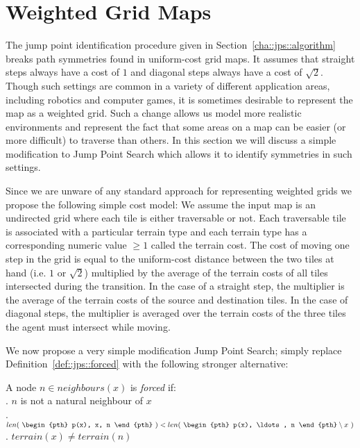 \section{Weighted Grid Maps}
The jump point identification procedure given in
Section~\ref{cha::jps::algorithm} breaks path symmetries found in uniform-cost
grid maps. It assumes that straight steps always have a cost of $1$ and
diagonal steps always have a cost of $\sqrt{2}$.  Though such settings are
common in a variety of different application areas, including robotics and
computer games, it is sometimes desirable to represent the map as a weighted
grid. Such a change allows us model more realistic environments and represent
the fact that some areas on a map can be easier (or more difficult) to
traverse than others.  In this section we will discuss a simple modification
to  Jump Point Search which allows it to identify symmetries in such settings.

Since we are unware of any standard approach for representing weighted grids
we propose the following simple cost model:
We assume the input map is an undirected grid where each tile is either
traversable or not.  Each traversable tile is associated with a particular
terrain type and each terrain type has a corresponding numeric value 
$\ge 1$ called the terrain cost.
The cost of moving one step in the grid is equal to the uniform-cost
distance between the two tiles at hand (i.e. $1$ or $\sqrt{2}$) multiplied by
the average of the terrain costs of all tiles intersected during the
transition.  In the case of a straight step, the multiplier is the average of
the terrain costs of the source and destination tiles. In the case of diagonal
steps, the multiplier is averaged over the terrain costs of the three tiles
the agent must intersect while moving.

We now propose a very simple modification Jump Point Search; 
simply replace Definition~\ref{def::jps::forced} with the following
stronger alternative:

\begin{definition}
\label{def::jps::wforced}
A node $n \in neighbours(x)$ is \emph{forced} if: \\
. $n$ is not a natural neighbour of $x$\\
. $ len(~\begin{pth} p(x), x, n \end{pth}~) < len(~ \begin{pth} p(x), \ldots, n \end{pth} \setminus x~)$ \\
. $terrain(x) \neq terrain(n)$
\end{definition}

